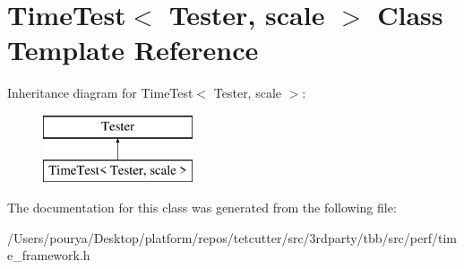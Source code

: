 \hypertarget{classTimeTest}{}\section{Time\+Test$<$ Tester, scale $>$ Class Template Reference}
\label{classTimeTest}
Inheritance diagram for Time\+Test$<$ Tester, scale $>$\+:\begin{figure}[H]
\begin{center}
\leavevmode
\includegraphics[height=2.000000cm]{classTimeTest}
\end{center}
\end{figure}


The documentation for this class was generated from the following file\+:\begin{DoxyCompactItemize}
\item 
/\+Users/pourya/\+Desktop/platform/repos/tetcutter/src/3rdparty/tbb/src/perf/time\+\_\+framework.\+h\end{DoxyCompactItemize}
